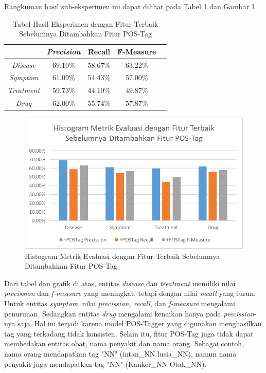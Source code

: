 	Rangkuman hasil sub-eksperimen ini dapat dilihat pada Tabel \ref{table:owndict4} dan Gambar \ref{fig:owndict4}.
	
	\begin{table}
		\centering
		\caption{Tabel Hasil Eksperimen dengan Fitur Terbaik Sebelumnya Ditambahkan Fitur POS-Tag}
		\begin{tabular}{|c|c|c|c|c|}
			\hline
								  & \textit{Precision} & \f{\f{Recall}} & \f{\f{F-Measure}} \\ \hline
			\textit{Disease}      & 69.10\%             & 58.67\%        & 63.22\%           \\ \hline
			\textit{Symptom}      & 61.09\%             & 54.43\%        & 57.00\%           \\ \hline
			\textit{Treatment}    & 59.73\%             & 44.10\%        & 49.87\%           \\ \hline
			\textit{Drug}		  & 62.00\%             & 55.74\%        & 57.87\%           \\ \hline
		\end{tabular}
		\label{table:owndict4}
	\end{table}
	
	\begin{figure}
		\centering
		\includegraphics[width=0.85\linewidth]{images/histogram4}
		\caption{Histogram Metrik Evaluasi dengan Fitur Terbaik Sebelumnya Ditambahkan Fitur POS-Tag}
		\label{fig:owndict4}
	\end{figure}
	
	Dari tabel dan grafik di atas, entitas \textit{disease} dan \textit{treatment} memiliki nilai \textit{precission} dan \textit{f-measure} yang meningkat, tetapi dengan nilai \textit{recall} yang turun. Untuk entitas \textit{symptom}, nilai \textit{precission, recall}, dan \textit{f-measure} mengalami penurunan. Sedangkan entitas \textit{drug} mengalami kenaikan hanya pada \textit{precission}-nya saja. Hal ini terjadi karena model POS-Tagger yang digunakan menghasilkan tag yang terkadang tidak konsisten. Selain itu, fitur POS-Tag juga tidak dapat membedakan entitas obat, nama penyakit dan nama orang. Sebagai contoh, nama orang mendapatkan tag "NN" (intan\_NN lusia\_NN), namun nama penyakit juga mendapatkan tag "NN" (Kanker\_NN Otak\_NN).
	

